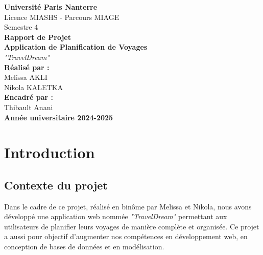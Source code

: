 \documentclass[a4paper,12pt]{article}
\begin{document}
\begin{titlepage}
    \centering
    {\Large \textbf{Université Paris Nanterre}}\\[0.5cm]
    {\large Licence MIASHS - Parcours MIAGE}\\[0.2cm]
    {\large Semestre 4}\\[2cm]

    {\huge \textbf{Rapport de Projet}}\\[0.5cm]
    {\LARGE \textbf{Application de Planification de Voyages}}\\[0.5cm]
    {\LARGE \textit{"TravelDream"}}\\[2cm]

    \textbf{Réalisé par :}\\
    Melissa AKLI \\
    Nikola KALETKA \\[0.5cm]

    \textbf{Encadré par :}\\
    Thibault Anani \\[2cm]

    \vfill
    \textbf{Année universitaire 2024-2025}
\end{titlepage}

\newpage
\tableofcontents
\newpage

\section{Introduction}

\subsection{Contexte du projet}
Dans le cadre de ce projet, réalisé en binôme par Melissa et Nikola, nous avons développé une application web nommée \textit{"TravelDream"} permettant aux utilisateurs de planifier leurs voyages de manière complète et organisée. Ce projet a aussi pour objectif d'augmenter nos compétences en développement web, en conception de bases de données et en modélisation.
\end{document}
